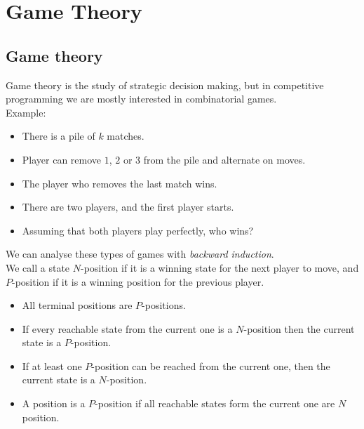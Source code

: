 \documentclass[12pt,t]{beamer}
\newcommand{\bi}{\begin{itemize}}
\newcommand{\ei}{\end{itemize}}
\begin{document}

\section{Game Theory}
\subsection{Game theory}
\begin{frame}
  \vspace{20pt}
  Game theory is the study of strategic decision making, but in competitive
  programming we are mostly interested in combinatorial games. \\
  \vspace{7pt}
  Example:
  \bi
    \item There is a pile of $k$ matches.
    \item Player can remove $1$, $2$ or $3$ from the pile and alternate on moves.
    \item The player who removes the last match wins.
    \item There are two players, and the first player starts.
    \item Assuming that both players play perfectly, who wins?
  \ei
\end{frame}

\begin{frame}
  \vspace{10pt}
  We can analyse these types of games with \emph{backward induction}.\\ 
  We call a state $N$-position if it is a winning state for the next player to
  move, and $P$-position if it is a winning position for the previous player.
  \bi
    \item All terminal positions are $P$-positions.
    \item If every reachable state from the current one is a $N$-position then
      the current state is a $P$-position.
    \item If at least one $P$-position can be reached from the current one,
      then the current state is a $N$-position.
    \item A position is a $P$-position if all reachable states form the current
      one are $N$ position.
  \ei
\end{frame}
\end{document}
